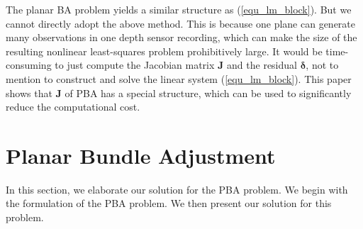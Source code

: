 \documentclass{vgtc}                          %
\begin{document}
The planar BA problem yields a similar structure as (\ref{equ_lm_block}).   But we cannot directly adopt the above method. This is because one plane can generate  many observations in one depth sensor recording, %
which can make the size of the resulting nonlinear least-squares problem prohibitively large. It would be time-consuming  to just  compute the Jacobian matrix $\mathbf{J}$ and the residual $\bm{\delta}$, not to mention to construct and  solve the linear system (\ref{equ_lm_block}). %
This paper shows that $\mathbf{J}$  of  PBA has a special structure, which can be used to significantly reduce the computational cost.

\section{Planar Bundle Adjustment}
In this section, we elaborate our solution for the PBA problem. We begin with the formulation of   the PBA problem. We then present our solution for this problem.


\end{document}
